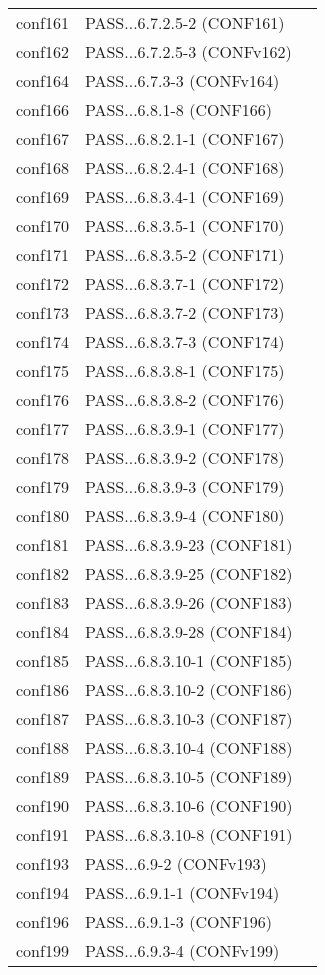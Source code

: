 \begin{tabular}{llc}
  conf161& PASS...6.7.2.5-2 (CONF161)&\\
  conf162& PASS...6.7.2.5-3 (CONFv162)&\\
  conf164& PASS...6.7.3-3 (CONFv164)&\\
  conf166& PASS...6.8.1-8 (CONF166)&\\
  conf167& PASS...6.8.2.1-1 (CONF167)&\\
  conf168& PASS...6.8.2.4-1 (CONF168)&\\
  conf169& PASS...6.8.3.4-1 (CONF169)&\\
  conf170& PASS...6.8.3.5-1 (CONF170)&\\
  conf171& PASS...6.8.3.5-2 (CONF171)&\\
  conf172& PASS...6.8.3.7-1 (CONF172)&\\
  conf173& PASS...6.8.3.7-2 (CONF173)&\\
  conf174& PASS...6.8.3.7-3 (CONF174)&\\
  conf175& PASS...6.8.3.8-1 (CONF175)&\\
  conf176& PASS...6.8.3.8-2 (CONF176)&\\
  conf177& PASS...6.8.3.9-1 (CONF177)&\\
  conf178& PASS...6.8.3.9-2 (CONF178)&\\
  conf179& PASS...6.8.3.9-3 (CONF179)&\\
  conf180& PASS...6.8.3.9-4 (CONF180)&\\
  conf181& PASS...6.8.3.9-23 (CONF181)&\\
  conf182& PASS...6.8.3.9-25 (CONF182)&\\
  conf183& PASS...6.8.3.9-26 (CONF183)&\\
  conf184& PASS...6.8.3.9-28 (CONF184)&\\
  conf185& PASS...6.8.3.10-1 (CONF185)&\\
  conf186& PASS...6.8.3.10-2 (CONF186)&\\
  conf187& PASS...6.8.3.10-3 (CONF187)&\\
  conf188& PASS...6.8.3.10-4 (CONF188)&\\
  conf189& PASS...6.8.3.10-5 (CONF189)&\\
  conf190& PASS...6.8.3.10-6 (CONF190)&\\
  conf191& PASS...6.8.3.10-8 (CONF191)&\\
  conf193& PASS...6.9-2 (CONFv193)&\\
  conf194& PASS...6.9.1-1 (CONFv194)&\\
  conf196& PASS...6.9.1-3 (CONF196)&\\
  conf199& PASS...6.9.3-4 (CONFv199)&\\

\end{tabular}
